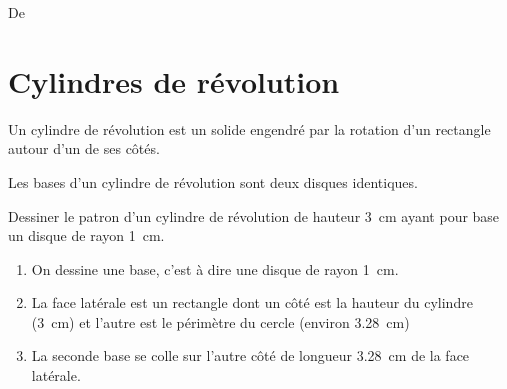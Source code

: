 
De \cite{NRHooXFvgpp5}


\section{Cylindres de révolution}

\begin{definition}
Un cylindre de révolution est un solide engendré par la rotation d'un rectangle autour d'un de ses côtés.
\end{definition}

\begin{propriete}
   Les bases d'un cylindre de révolution sont deux disques identiques.
\end{propriete}


\begin{example}
    Dessiner le patron d'un cylindre de révolution de hauteur \SI{3}{\centi\meter} ayant pour base un disque de rayon \SI{1}{\centi\meter}.



    \begin{enumerate}
        \item
            On dessine une base, c'est à dire une disque de rayon \SI{1}{\centi\meter}.
\begin{center}
   
\end{center}
        \item


            La face latérale est un rectangle dont un côté est la hauteur du cylindre (\SI{3}{\centi\meter}) et l'autre est le périmètre du cercle (environ \SI{3.28}{\centi\meter})


\begin{center}
   
\end{center}

        \item
            La seconde base se colle sur l'autre côté de longueur \SI{3.28}{\centi\meter} de la face latérale.
\begin{center}
   
\end{center}
    \end{enumerate}
\end{example}

